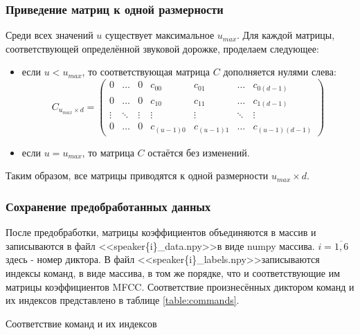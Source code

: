 \subsubsection{Приведение матриц к одной размерности}
Среди всех значений $u$ существует максимальное $u_{max}$. Для каждой матрицы, соответствующей определённой звуковой дорожке, проделаем следующее:
\begin{itemize}[leftmargin=2cm]
	\item если $u < u_{max}$, то соответствующая матрица $C$ дополняется нулями слева:
	\begin{equation*}
		C_{u_{max} \times d} = \left(
		\begin{array}{ccccccc}
			0 & \ldots & 0 & c_{00} & c_{01} & \ldots & c_{0(d-1)}\\
			0 & \ldots & 0 & c_{10} &  c_{11} & \ldots & c_{1(d-1)}\\
			\vdots & \ddots & \vdots & \vdots & \vdots & \ddots & \vdots\\
			0 & \ldots & 0 & c_{(u-1)0} & c_{(u-1)1} & \ldots & c_{(u-1)(d-1)}
		\end{array}
		\right)
	\end{equation*}
	\item если $u = u_{max}$, то матрица $C$ остаётся без изменений.
\end{itemize}

Таким образом, все матрицы приводятся к одной размерности $u_{max} \times d$.

\subsubsection{Сохранение предобработанных данных}
\label{par:saving_preprocessed_data}
После предобработки, матрицы коэффициентов объединяются в массив и записываются в файл <<speaker\{i\}\_data.npy>>\footnotemark \space в виде numpy массива. $i=\overline{1,6}$ здесь - номер диктора. В файл <<speaker\{i\}\_labels.npy>>\footnotemark[\value{footnote}] записываются индексы команд, в виде массива, в том же порядке, что и соответствующие им матрицы коэффициентов MFCC. Соответствие произнесённых диктором команд и их индексов представлено в таблице \ref{table:commands}.
 
 
\begin{table}[H]
	\small
 	\centering
	\caption{Соответствие команд и их индексов}
 	\label{table:commands}
\end{table}

